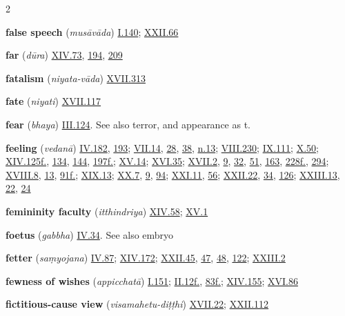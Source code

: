 \begin{multicols}{2}
\begin{vismHanging}
\par\textbf{false speech} (\emph{musāvāda}) \hyperlink{I.140}{I.140}{}; \hyperlink{XXII.66}{XXII.66}{}
\par\textbf{far} (\emph{dūra}) \hyperlink{XIV.73}{XIV.73}{}, \hyperlink{XIV.194}{194}{}, \hyperlink{XIV.209}{209}{}
\par\textbf{fatalism} (\emph{niyata-vāda}) \hyperlink{XVII.313}{XVII.313}{}
\par\textbf{fate} (\emph{niyati}) \hyperlink{XVII.117}{XVII.117}{}
\par\textbf{fear} (\emph{bhaya}) \hyperlink{III.124}{III.124}{}. See also terror, and appearance as t. 
\par\textbf{feeling} (\emph{vedanā}) \hyperlink{IV.182}{IV.182}{}, \hyperlink{IV.193}{193}{}; \hyperlink{VII.14}{VII.14}{}, \hyperlink{VII.28}{28}{}, \hyperlink{VII.38}{38}{}, \hyperlink{VII.n13}{n.13}{}; \hyperlink{VIII.230}{VIII.230}{}; \hyperlink{IX.111}{IX.111}{}; \hyperlink{X.50}{X.50}{}; \hyperlink{XIV.125}{XIV.125f.}{}, \hyperlink{XIV.134}{134}{}, \hyperlink{XIV.144}{144}{}, \hyperlink{XIV.197}{197f.}{}; \hyperlink{XV.14}{XV.14}{}; \hyperlink{XVI.35}{XVI.35}{}; \hyperlink{XVII.2}{XVII.2}{}, \hyperlink{XVII.9}{9}{}, \hyperlink{XVII.32}{32}{}, \hyperlink{XVII.51}{51}{}, \hyperlink{XVII.163}{163}{}, \hyperlink{XVII.228}{228f.}{}, \hyperlink{XVII.294}{294}{}; \hyperlink{XVIII.8}{XVIII.8}{}, \hyperlink{XVIII.13}{13}{}, \hyperlink{XVIII.91}{91f.}{}; \hyperlink{XIX.13}{XIX.13}{}; \hyperlink{XX.7}{XX.7}{}, \hyperlink{XX.9}{9}{}, \hyperlink{XX.94}{94}{}; \hyperlink{XXI.11}{XXI.11}{}, \hyperlink{XXI.56}{56}{}; \hyperlink{XXII.22}{XXII.22}{}, \hyperlink{XXII.34}{34}{}, \hyperlink{XXII.126}{126}{}; \hyperlink{XXIII.13}{XXIII.13}{}, \hyperlink{XXIII.22}{22}{}, \hyperlink{XXIII.24}{24}{}
\par\textbf{femininity faculty} (\emph{itthindriya}) \hyperlink{XIV.58}{XIV.58}{}; \hyperlink{XV.1}{XV.1}{}
\par\textbf{foetus} (\emph{gabbha}) \hyperlink{IV.34}{IV.34}{}. See also embryo
\par\textbf{fetter} (\emph{saṃyojana}) \hyperlink{IV.87}{IV.87}{}; \hyperlink{XIV.172}{XIV.172}{}; \hyperlink{XXII.45}{XXII.45}{}, \hyperlink{XXII.47}{47}{}, \hyperlink{XXII.48}{48}{}, \hyperlink{XXII.122}{122}{}; \hyperlink{XXIII.2}{XXIII.2}{}
\par\textbf{fewness of wishes} (\emph{appicchatā}) \hyperlink{I.151}{I.151}{}; \hyperlink{II.12}{II.12f.}{}, \hyperlink{II.83}{83f.}{}; \hyperlink{XIV.155}{XIV.155}{}; \hyperlink{XVI.86}{XVI.86}{}
\par\textbf{fictitious-cause view} (\emph{visamahetu-diṭṭhi}) \hyperlink{XVII.22}{XVII.22}{}; \hyperlink{XXII.112}{XXII.112}{}

\end{vismHanging}
\end{multicols}
